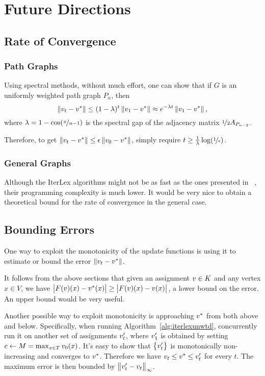 \documentclass[12pt]{amsart}
\begin{document}
\section{Future Directions}
\subsection{Rate of Convergence}\label{sec:rateofconv}
\subsubsection{Path Graphs}
Using spectral methods, without much effort, one can show that if $G$ is an uniformly weighted path graph $P_n$, then $$\left\lVert v_t-v^* \right\rVert\leq(1-\lambda)^t\left\lVert v_1-v^* \right\rVert\approx e^{-\lambda t}\left\lVert v_1-v^* \right\rVert,$$ where $\lambda = 1-\cos(\nicefrac{\pi}{n-1})$ is the spectral gap of the adjacency matrix $\nicefrac{1}{2}A_{P_{n-2}}$.

Therefore, to get $\left\lVert v_t-v^* \right\rVert\leq \epsilon\left\lVert v_0-v^* \right\rVert$, simply require $t\geq \frac{1}{\lambda}\log(\nicefrac{1}{\epsilon})$.

\subsubsection{General Graphs}
Although the IterLex algorithms might not be as fast as the ones presented in ~\cite{KRSS15}, their programming complexity is much lower. It would be very nice to obtain a theoretical bound for the rate of convergence in the general case.

\subsection{Bounding Errors}
One way to exploit the monotonicity of the update functions is using it to estimate or bound the error $\left\lVert v_t-v^* \right\rVert$.

It follows from the above sections that given an assignment $v\in K$ and any vertex $x\in V$, we have $\left| F(v)(x) - v^*(x) \right| \geq \left| F(v)(x)-v(x) \right|$, a lower bound on the error. An upper bound would be very useful.

Another possible way to exploit monotonicity is approaching $v^*$ from both above and below. Specifically, when running Algorithm~\ref{alg:iterlexunwtd}, concurrently run it on another set of assignments $v^\prime_t$, where $v_1^\prime$ is obtained by setting $c\gets M = \max_{x\in T}v_0(x)$. It's easy to show that $\left\{v_t^\prime\right\}$ is monotonically non-increasing and converges to $v^*$. Therefore we have $v_t\leq v^* \leq v_t^\prime$ for every $t$. The maximum error is then bounded by $\left\lVert v_t^\prime-v_t \right\rVert_\infty$.
\end{document}
